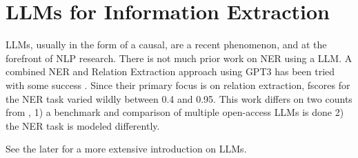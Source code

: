 \section{LLMs for Information Extraction}\label{sec:llmie}
\glspl{LLM}, usually in the form of a \gls{causal}, are a recent phenomenon, and at the forefront of \gls{NLP} research.
There is not much prior work on \gls{NER} using a \gls{LLM}.
A combined \gls{NER} and Relation Extraction approach using \gls{GPT3} has been tried with some success \cite{dunn_structured_2022}.
Since their primary focus is on relation extraction, \glspl{fscore} for the \gls{NER} task varied wildly between 0.4 and 0.95.
This work differs on two counts from \cite{dunn_structured_2022}, 1) a benchmark and comparison of multiple open-access \glspl{LLM} is done 2) the \gls{NER} task is modeled differently.

See the later  for a more extensive introduction on \glspl{LLM}.


